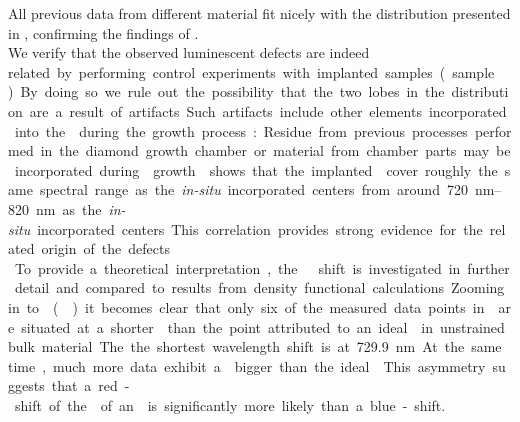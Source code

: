 	All previous data from different \nd material fit nicely with the \ZPL distribution presented in , confirming the findings of .
	\\
	We verify that the observed luminescent defects are indeed \si related by performing control experiments with \si implanted samples (sample \implantedTao).
	By doing so we rule out the possibility that the two lobes in the distribution are a result of artifacts.
	Such artifacts include other elements incorporated into the \nds during the growth process: Residue from previous processes performed in the diamond growth chamber or material from chamber parts may be incorporated during \nd growth.
	 shows that the implanted \sivs cover roughly the same spectral range as the \textit{in-situ} incorporated centers from around \SIrange{720}{820}{nm} as the \textit{in-situ} incorporated centers.
	This correlation provides strong evidence for the \si related origin of the defects.
	\\
	To provide a theoretical interpretation, the \ZPL \cwl shift is investigated in further detail and compared to results from density functional calculations.
	Zooming in to \vl () it becomes clear that only six of the measured data points in \vl are situated at a shorter \cwl than the point attributed to an ideal \siv in unstrained bulk material.
	The the shortest wavelength shift is at \SI{729.9}{nm}.
	At the same time, much more data exhibit a \cwl bigger than the ideal \siv.
	This asymmetry suggests that a red-shift of the \ZPL of an \siv is significantly more likely than a blue-shift.


